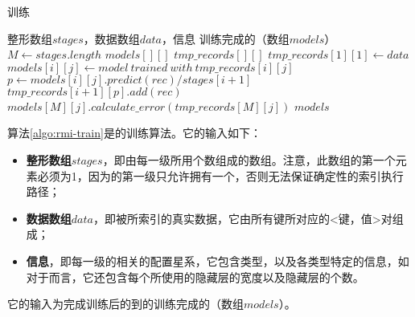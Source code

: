 \begin{algorithm}
\caption{{\rmi}训练}
\label{algo:rmi-train}
\begin{algorithmic}[1] %
\Require 整形数组$stages$，数据数组$data$，{\model}信息 %
\Ensure 训练完成的{\rmi}（{\model}数组$models$） %
\State $M \gets stages.length$
\label{rmi-train:line:stage-length}
\State $models[][]$
\label{rmi-train:line:init-models}
\State $tmp\_records[][]$
\label{rmi-train:line:init-data}
\State $tmp\_records[1][1] \gets data$
\label{rmi-train:line:init-data-root}
  \label{rmi-train:line:stage-begin}
    \State $models[i][j] \gets model~trained~with~tmp\_records[i][j]$
    \label{rmi-train:line:train-model}
    \label{rmi-train:line:assign-precond}
      \label{rmi-train:line:assign-begin}
        \State $p \gets models[i][j].predict(rec) / stages[i+1]$
        \State $tmp\_records[i+1][p].add(rec)$
      \EndFor
      \label{rmi-train:line:assign-end}
    \EndIf
  \EndFor
  \label{rmi-train:line:stage-end}
\EndFor
{}
\label{rmi-train:line:error-begin}
  \State $models[M][j].calculate\_error(tmp\_records[M][j])$
\EndFor
\label{rmi-train:line:error-end}
\State \Return $models$
\label{rmi-train:line:return}
\end{algorithmic}
\end{algorithm}

算法\ref{algo:rmi-train}是{\rmi}的训练算法。它的输入如下：
\begin{itemize}
  \item \textbf{整形数组$stages$}，即由{\rmi}每一级所用{\model}个数组成的数组。注意，此数组的第一个元素必须为1，因为{\rmi}的第一级只允许拥有一个{\model}，否则无法保证确定性的索引执行路径；
  \item \textbf{数据数组$data$}，即被{\rmi}所索引的真实数据，它由所有键所对应的<键，{\cdf}值>对组成；
  \item \textbf{{\model}信息}，即每一级的{\model}相关的配置星系，它包含{\model}类型，以及各类型{\model}特定的信息，如对于{\nn}而言，它还包含每个{\nn}所使用的隐藏层的宽度以及隐藏层的个数。
\end{itemize}
它的输入为完成训练后的到的训练完成的{\rmi}（{\model}数组$models$）。

